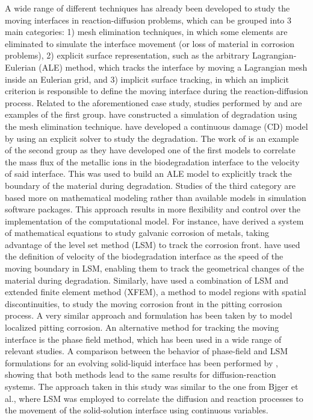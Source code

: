 A wide range of different techniques has already been developed to study the moving interfaces in reaction-diffusion problems, which can be grouped into 3 main categories: 1) mesh elimination techniques, in which some elements are eliminated to simulate the interface movement (or loss of material in corrosion problems), 2) explicit surface representation, such as the arbitrary Lagrangian-Eulerian ({ALE}) method, which tracks the interface by moving a Lagrangian mesh inside an Eulerian grid, and 3) implicit surface tracking, in which an implicit criterion is responsible to define the moving interface during the reaction-diffusion process. Related to the aforementioned case study, studies performed by  \cite{Gao2018} and \cite{Gastaldi2011} are examples of the first group. \cite{Gao2018} have constructed a simulation of degradation using the mesh elimination technique. \cite{Gastaldi2011} have developed a continuous damage ({CD}) model by using an explicit solver to study the degradation. The work of \cite{Grogan2014} is an example of the second group as they have developed one of the first models to correlate the mass flux of the metallic ions in the biodegradation interface to the velocity of said interface. This was used to build an {ALE} model to explicitly track the boundary of the material during degradation. Studies of the third category are based more on mathematical modeling rather than available models in simulation software packages. This approach results in more flexibility and control over the implementation of the computational model. For instance, \cite{Wilder2014} have derived a system of mathematical equations to study galvanic corrosion of metals, taking advantage of the level set method ({LSM}) to track the corrosion front. \cite{Bajger2016} have used the definition of velocity of the biodegradation interface as the speed of the moving boundary in {LSM}, enabling them to track the geometrical changes of the material during degradation. Similarly, \cite{Vagbharathi2014} have used a combination of {LSM} and extended finite element method (XFEM), a method to model regions with spatial discontinuities, to study the moving corrosion front in the pitting corrosion process. A very similar approach and formulation has been taken by \cite{Duddu2014} to model localized pitting corrosion. An alternative method for tracking the moving interface is the phase field method, which has been used in a wide range of relevant studies. A comparison between the behavior of phase-field and {LSM} formulations for an evolving solid-liquid interface has been performed by \cite{Xu2012}, showing that both methods lead to the same results for diffusion-reaction systems. The approach taken in this study was similar to the one from Bjger et al., where {LSM} was employed to correlate the diffusion and reaction processes to the movement of the solid-solution interface using continuous variables.

